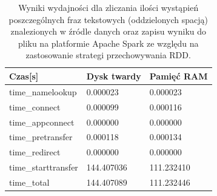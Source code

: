 \begin{table}[]
	\centering
	\caption{Wyniki wydajności dla zliczania ilości wystąpień poszczególnych fraz tekstowych (oddzielonych spacją) znalezionych w źródle danych oraz zapisu wyniku do pliku na platformie Apache Spark ze względu na zastosowanie strategi przechowywania RDD.}
	\label{tab:word-count-spark-modes-results}
	\begin{tabular}{|l|l|l|}
		\hline
		Czas{[}s{]}         & Dysk twardy & Pamięć RAM \\ \hline
		time\_namelookup    & 0.000023    & 0.000023   \\ \hline
		time\_connect       & 0.000099    & 0.000116   \\ \hline
		time\_appconnect    & 0.000000    & 0.000000   \\ \hline
		time\_pretransfer   & 0.000118    & 0.000134   \\ \hline
		time\_redirect      & 0.000000    & 0.000000   \\ \hline
		time\_starttransfer & 144.407036  & 111.232410 \\ \hline
		time\_total         & 144.407089  & 111.232446 \\ \hline
	\end{tabular}
\end{table}

